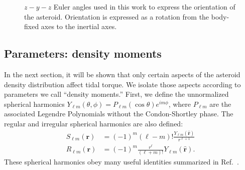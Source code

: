 \documentclass[fleqn,usenatbib]{mnras}
\newcommand{\unit}[1]{\bm{\hat{#1}}}
\begin{document}
\begin{figure}
    \centering
    \caption{$z-y-z$ Euler angles used in this work to express the orientation of the asteroid. Orientation is expressed as a rotation from the body-fixed axes to the inertial axes.}
    \label{fig:euler-angles}
\end{figure}


\subsection{Parameters: density moments}
\label{sec:moments}

In the next section, it will be shown that only certain aspects of the asteroid density distribution affect tidal torque. We isolate those aspects according to parameters we call ``density moments.'' First, we define the unnormalized spherical harmonics $Y_{\ell m}(\theta, \phi) = P_{\ell m}(\cos \theta)e^{im\phi}$, where $P_{\ell m}$ are the associated Legendre Polynomials without the Condon-Shortley phase. The regular and irregular spherical harmonics are also defined:
\begin{equation}
  \begin{split}
    S_{\ell m}(\bm r) &= (-1)^m (\ell - m)! \frac{Y_{\ell m}(\unit r)}{r^{\ell+1}} \\
    R_{\ell m} (\bm r) &= (-1)^m \frac{r^\ell}{(\ell + m)!} Y_{\ell m}(\unit r).
  \end{split}
\end{equation}
These spherical harmonics obey many useful identities summarized in Ref.~\cite{Gelderen1998TheSO}.
\end{document}
